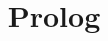 \documentclass{article}
\begin{document}


\pagestyle{fancy}
\renewcommand{\sectionmark}[1]{\markboth{}{\thesection\ \ #1}}
\lhead{}
\chead{}
\rhead{\rightmark}
\lfoot{}
\cfoot{}
\rfoot{\thepage}



\title{Prolog}
\author{}


\end{document}
